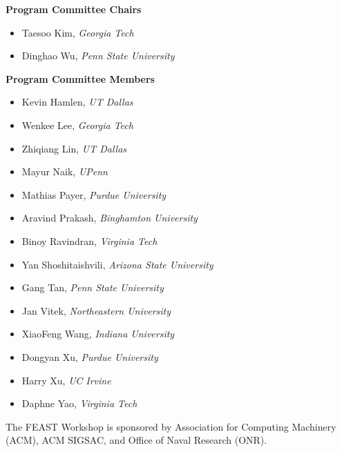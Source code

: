 \documentclass[sigconf]{acmart}
\begin{document}
\noindent
\textbf{Program Committee Chairs}
\begin{itemize}
\item Taesoo Kim, \textit{Georgia Tech}%
\item Dinghao Wu, \textit{Penn State University}%
\end{itemize}

\noindent
\textbf{Program Committee Members}
\begin{itemize}
\item Kevin Hamlen, \textit{UT Dallas}
\item Wenkee Lee, \textit{Georgia Tech}
\item Zhiqiang Lin, \textit{UT Dallas}
\item Mayur Naik, \textit{UPenn}
\item Mathias Payer, \textit{Purdue University}
\item Aravind Prakash, \textit{Binghamton University}
\item Binoy Ravindran, \textit{Virginia Tech}
\item Yan Shoshitaishvili, \textit{Arizona State University}
\item Gang Tan, \textit{Penn State University}
\item Jan Vitek, \textit{Northeastern University}
\item XiaoFeng Wang, \textit{Indiana University}
\item Dongyan Xu, \textit{Purdue University}
\item Harry Xu, \textit{UC Irvine}
\item Daphne Yao, \textit{Virginia Tech}
\end{itemize}


\begin{acks}
The FEAST Workshop is sponsored by Association for Computing Machinery
(ACM), ACM SIGSAC, and Office of Naval Research (ONR).
\end{acks}


\end{document}

